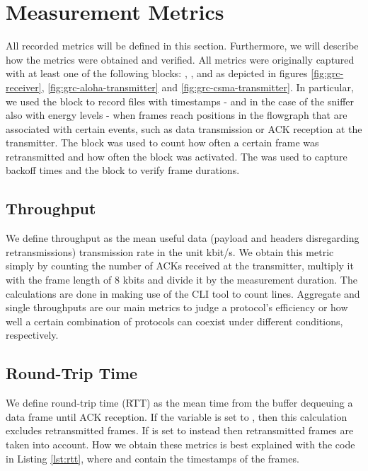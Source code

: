 \clearpage

\section{Measurement Metrics}
\label{sec:measurement-metrics}

All recorded metrics will be defined in this section. Furthermore, we will describe how the metrics were obtained and verified. All metrics were originally captured with at least one of the following blocks: , ,  and  as depicted in figures \ref{fig:grc-receiver}, \ref{fig:grc-aloha-transmitter} and \ref{fig:grc-csma-transmitter}. In particular, we used the  block to record files with timestamps - and in the case of the sniffer also with energy levels - when frames reach positions in the flowgraph that are associated with certain events, such as data transmission or ACK reception at the transmitter. The  block was used to count how often a certain frame was retransmitted and how often the  block was activated. The  was used to capture backoff times and the  block to verify frame durations.

\subsection{Throughput}

We define throughput as the mean useful data (payload and headers disregarding retransmissions) transmission rate in the unit kbit/s. We obtain this metric simply by counting the number of ACKs received at the transmitter, multiply it with the frame length of 8 kbits and divide it by the measurement duration. The calculations are done in  making use of the CLI tool  to count lines. Aggregate and single throughputs are our main metrics to judge a protocol's efficiency or how well a certain combination of protocols can coexist under different conditions, respectively.

\subsection{Round-Trip Time}
\label{sec:rtt}

We define round-trip time (RTT) as the mean time from the buffer dequeuing a data frame until ACK reception. If the variable  is set to , then this calculation excludes retransmitted frames. If  is set to  instead then retransmitted frames are taken into account. How we obtain these metrics is best explained with the code in Listing \ref{lst:rtt}, where  and  contain the timestamps of the frames. 

